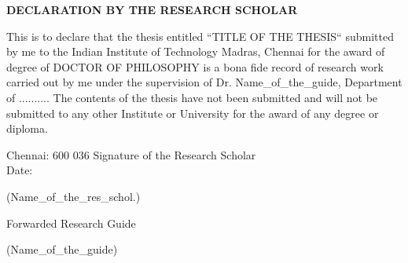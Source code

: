 \begin{center}
\textbf{DECLARATION BY THE RESEARCH SCHOLAR}
\end{center}

\begin{doublespacing}
    

    This is to declare that the thesis entitled “TITLE OF THE THESIS“ submitted by me to the 
Indian Institute of Technology Madras, Chennai for the award of degree of DOCTOR OF 
PHILOSOPHY is a bona fide record of research work carried out by me under the supervision 
of Dr. Name\_of\_the\_guide, Department of .......... The contents of the thesis have not 
been submitted and will not be submitted to any other Institute or University for the award of 
any degree or diploma.  


\vspace{2cm}

Chennai: 600 036 \hfill Signature of the Research Scholar\\
Date:

\hfill (Name\_of\_the\_res\_schol.)

Forwarded
Research Guide

(Name\_of\_the\_guide) 

\end{doublespacing}